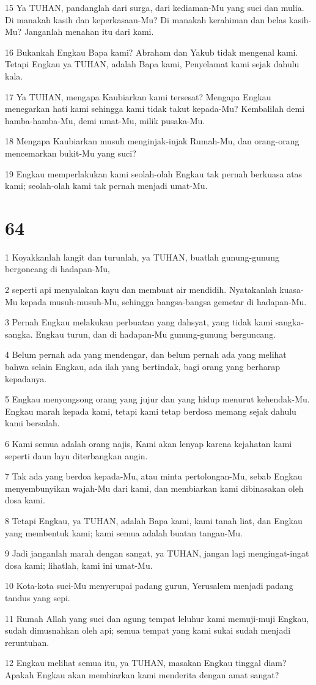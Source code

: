 \par 15 Ya TUHAN, pandanglah dari surga, dari kediaman-Mu yang suci dan mulia. Di manakah kasih dan keperkasaan-Mu? Di manakah kerahiman dan belas kasih-Mu? Janganlah menahan itu dari kami.
\par 16 Bukankah Engkau Bapa kami? Abraham dan Yakub tidak mengenal kami. Tetapi Engkau ya TUHAN, adalah Bapa kami, Penyelamat kami sejak dahulu kala.
\par 17 Ya TUHAN, mengapa Kaubiarkan kami tersesat? Mengapa Engkau menegarkan hati kami sehingga kami tidak takut kepada-Mu? Kembalilah demi hamba-hamba-Mu, demi umat-Mu, milik pusaka-Mu.
\par 18 Mengapa Kaubiarkan musuh menginjak-injak Rumah-Mu, dan orang-orang mencemarkan bukit-Mu yang suci?
\par 19 Engkau memperlakukan kami seolah-olah Engkau tak pernah berkuasa atas kami; seolah-olah kami tak pernah menjadi umat-Mu.

\chapter{64}

\par 1 Koyakkanlah langit dan turunlah, ya TUHAN, buatlah gunung-gunung bergoncang di hadapan-Mu,
\par 2 seperti api menyalakan kayu dan membuat air mendidih. Nyatakanlah kuasa-Mu kepada musuh-musuh-Mu, sehingga bangsa-bangsa gemetar di hadapan-Mu.
\par 3 Pernah Engkau melakukan perbuatan yang dahsyat, yang tidak kami sangka-sangka. Engkau turun, dan di hadapan-Mu gunung-gunung berguncang.
\par 4 Belum pernah ada yang mendengar, dan belum pernah ada yang melihat bahwa selain Engkau, ada ilah yang bertindak, bagi orang yang berharap kepadanya.
\par 5 Engkau menyongsong orang yang jujur dan yang hidup menurut kehendak-Mu. Engkau marah kepada kami, tetapi kami tetap berdosa memang sejak dahulu kami bersalah.
\par 6 Kami semua adalah orang najis, Kami akan lenyap karena kejahatan kami seperti daun layu diterbangkan angin.
\par 7 Tak ada yang berdoa kepada-Mu, atau minta pertolongan-Mu, sebab Engkau menyembunyikan wajah-Mu dari kami, dan membiarkan kami dibinasakan oleh dosa kami.
\par 8 Tetapi Engkau, ya TUHAN, adalah Bapa kami, kami tanah liat, dan Engkau yang membentuk kami; kami semua adalah buatan tangan-Mu.
\par 9 Jadi janganlah marah dengan sangat, ya TUHAN, jangan lagi mengingat-ingat dosa kami; lihatlah, kami ini umat-Mu.
\par 10 Kota-kota suci-Mu menyerupai padang gurun, Yerusalem menjadi padang tandus yang sepi.
\par 11 Rumah Allah yang suci dan agung tempat leluhur kami memuji-muji Engkau, sudah dimusnahkan oleh api; semua tempat yang kami sukai sudah menjadi reruntuhan.
\par 12 Engkau melihat semua itu, ya TUHAN, masakan Engkau tinggal diam? Apakah Engkau akan membiarkan kami menderita dengan amat sangat?

